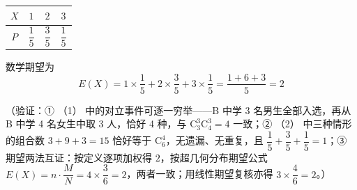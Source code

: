 \begin{answer}
\begin{center}
\begin{tabular}{cccc}
\toprule
\(X\) & \(1\) & \(2\) & \(3\) \\
\midrule
\(P\) & \(\dfrac15\) & \(\dfrac35\) & \(\dfrac15\) \\
\bottomrule
\end{tabular}
\end{center}

数学期望为
\nopagebreak[4]
\[E(X)=1\times\dfrac15+2\times\dfrac35+3\times\dfrac15=\dfrac{1+6+3}{5}=2\]

（验证：① （1） 中的对立事件可逐一穷举——B 中学 3 名男生全部入选，再从 B 中学 4 名女生中取 3 人，恰好 4 种，与 \(\mathrm{C}_3^3\mathrm{C}_4^3=4\) 一致；② （2） 中三种情形的组合数 \(3+9+3=15\) 恰好等于 \(\mathrm{C}_6^4\)，无遗漏、无重复，且 \(\dfrac15+\dfrac35+\dfrac15=1\)；③ 期望两法互证：按定义逐项加权得 \(2\)，按超几何分布期望公式 \(E(X)=n\cdot\dfrac MN=4\times\dfrac36=2\)，两者一致；用线性期望复核亦得 \(3\times\dfrac46=2\)。）



\end{answer}
